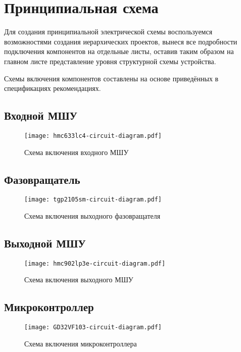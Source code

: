 \chapter{Принципиальная схема}

Для создания принципиальной электрической схемы воспользуемся возможностями создания иерархических проектов, вынеся все подробности подключения компонентов на отдельные листы, оставив таким образом на главном листе представление уровня структурной схемы устройства.

Схемы включения компонентов составлены на основе приведённых в спецификациях рекомендациях.

\section{Входной МШУ}

\begin{figure}[H]
    \centering
    \texttt{[image: hmc633lc4-circuit-diagram.pdf]}
    \caption{Схема включения входного МШУ}%
    \label{fig:hmc633lc4-circuit-diagram}
\end{figure}

\section{Фазовращатель}

\begin{figure}[H]
    \centering
    \texttt{[image: tgp2105sm-circuit-diagram.pdf]}
    \caption{Схема включения выходного фазовращателя}%
    \label{fig:tgp2105sm-circuit-diagram}
\end{figure}

\section{Выходной МШУ}

\begin{figure}[H]
    \centering
    \texttt{[image: hmc902lp3e-circuit-diagram.pdf]}
    \caption{Схема включения выходного МШУ}%
    \label{fig:hmc902lp3e-circuit-diagram}
\end{figure}

\section{Микроконтроллер}

\begin{figure}[H]
    \centering
    \texttt{[image: GD32VF103-circuit-diagram.pdf]}
    \caption{Схема включения микроконтроллера}%
    \label{fig:GD32VF103-circuit-diagram}
\end{figure}

